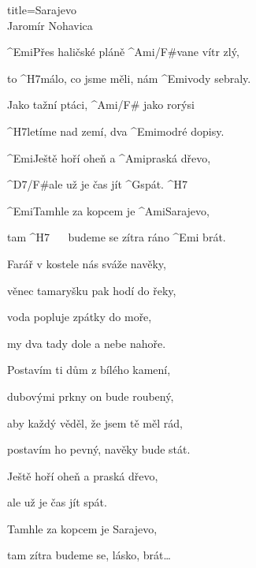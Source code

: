 \begin{song}{title=\predtitle\centering Sarajevo \\\large Jaromír Nohavica \vspace*{-0.3cm}}  %
\begin{centerjustified}
\nejvetsi

\sloka 
	^{Emi}Přes haličské pláně ^{Ami/F#}vane vítr zlý,
	
	to ^{H7\z}málo, co jsme měli, nám ^{Emi\z}vody sebraly.
	
	Jako tažní ptáci, ^{Ami/F# }jako rorýsi
	
	^{H7\z}letíme nad zemí, dva ^{Emi\z}modré dopisy.

	^{Emi\z}Ještě hoří oheň a ^{Ami\z}praská dřevo,
	
	^{D7/F#}ale už je čas jít ^{G\z}spát. ^{H7}

	^{Emi\z}Tamhle za kopcem je ^{Ami\z}Sarajevo,
	
	tam ^{H7\,\,\,\,\,\,\,\,\,\,}budeme se zítra ráno ^{Emi\,\,}brát.

\sloka
	Farář v kostele nás sváže navěky,
	
	věnec tamaryšku pak hodí do řeky,
	
	voda popluje zpátky do moře,
	
	my dva tady dole a nebe nahoře.


\sloka
	Postavím ti dům z bílého kamení,
	
	dubovými prkny on bude roubený,

	aby každý věděl, že jsem tě měl rád,
	
	postavím ho pevný, navěky bude stát.

	Ještě hoří oheň a praská dřevo,
	
	ale už je čas jít spát.
	
	Tamhle za kopcem je Sarajevo,
	
	tam zítra budeme se, lásko, brát\elipsa\dots

\end{centerjustified}
\setcounter{Slokočet}{0}
\end{song}
